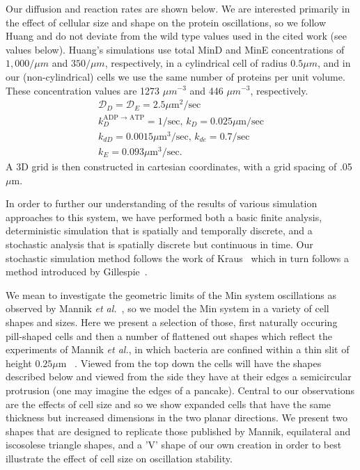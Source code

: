 \documentclass[letterpaper,twocolumn,amsmath,amssymb,pre]{revtex4-1}
\newcommand\micron{\ensuremath{\mu\text{m}}}
\begin{document}
Our diffusion and reaction rates are shown below.  We are interested
primarily in the effect of cellular size and shape on the protein
oscillations, so we follow Huang\cite{huang2003dynamic} and do not
deviate from the wild type values used in the cited work (see values
below).  Huang's simulations use total MinD and MinE concentrations of
$1,000/\mu m$ and $350/\mu m$, respectively, in a cylindrical cell of
radius $0.5\mu m$, and in our (non-cylindrical) cells we use the same
number of proteins per unit volume.  These concentration values are
1273 $\mu m^{-3}$ and 446 $\mu m^{-3}$, respectively.
\begin{gather*}
  \mathcal{D}_D = \mathcal{D}_{E} = 2.5\micron^2/\text{sec}\\
  k_D^{\textrm{ADP $\rightarrow$ ATP}} = 1/\textrm{sec,  }
  k_D = 0.025 \micron /\textrm{sec}\\
  k_{dD} = 0.0015 \micron^3/ \textrm{sec,  }
  k_{de} = 0.7/\textrm{sec}\\
  k_E = 0.093 \micron^3 /\textrm{sec}.
\end{gather*}
A 3D grid is then constructed in cartesian coordinates, with a grid
spacing of .05\micron.

In order to further our understanding of the results of various
simulation approaches to this system, we have performed both a basic
finite analysis, deterministic simulation that is spatially and
temporally discrete, and a stochastic analysis that is spatially
discrete but continuous in time.  Our stochastic simulation method
follows the work of Kraus~\cite{kraus1996crosstalk} which in turn
follows a method introduced by Gillespie~\cite{gillespie1977exact}.

We mean to investigate the geometric limits of the Min system
oscillations as observed by Mannik \emph{et
  al.}~\cite{mannik2012robustness}, so we model the Min system in a
variety of cell shapes and sizes.  Here we present a selection of
those, first naturally occuring pill-shaped cells and then a
number of flattened out shapes which reflect the experiments of Mannik
\emph{et al.}, in which bacteria are confined within a thin slit of
height $0.25\micron$ ~\cite{mannik2012robustness}. Viewed from the top
down the cells will have the shapes described below and viewed from
the side they have at their edges a semicircular protrusion (one may
imagine the edges of a pancake). Central to our observations are the
effects of cell size and so we show expanded cells that have the same
thickness but increased dimensions in the two planar directions.  We
present two shapes that are designed to replicate those published by
Mannik, equilateral and iscosolese triangle shapes, and a 'V' shape of
our own creation in order to best illustrate the effect of cell size
on oscillation stability.
\end{document}
